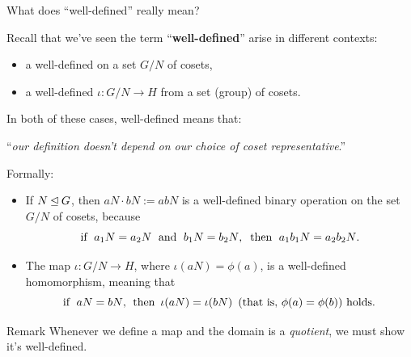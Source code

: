 \documentclass[8pt]{beamer}
\newcommand{\Pause}{}      %
\begin{document}
\begin{frame}{What does ``well-defined'' really mean?} 
  
  Recall that we've seen the term ``\textbf{well-defined}'' arise in
  different contexts: \smallskip\Pause
  \begin{itemize}
  \item a well-defined  on a set $G/N$
    of cosets, \smallskip\Pause
  \item a well-defined  $\iota\colon G/N\to H$ from a
    set (group) of cosets. \Pause
  \end{itemize}
  
  \medskip
  
  In both of these cases, well-defined means that: 
  \begin{center}
    ``\emph{our definition doesn't depend on our choice of coset representative}.'' 
  \end{center}
  
  \Pause
  
  Formally:
  
  \begin{itemize}
  \item If $N\unlhd G$, then $aN\cdot bN:=abN$ is a
    {\color{blue}well-defined binary operation} on the set $G/N$ of
    cosets, \Pause because
    \[
    \text{if\; $a_1N=a_2N$\; and\; $b_1N=b_2N$},\;\;\Pause \text{then\; $a_1b_1N=a_2b_2N$}. 
    \] \vspace{-5mm}\Pause
  \item The map $\iota\colon G/N\to H$, where $\iota(aN)=\phi(a)$, is a 
    {\color{red}well-defined homomorphism}, \Pause meaning that    
    \[
    \text{if\; $aN=bN$,\; then\, $\iota(aN)=\iota(bN)$\, (that is, $\phi(a)=\phi(b)$) holds.}
    \]
  \end{itemize}
  
  \vspace{-1mm}\Pause
  
  \begin{alertblock}{Remark}
    Whenever we define a map and the domain is a \emph{quotient}, we
    must show it's well-defined.
  \end{alertblock}
  
\end{frame}

\end{document}
